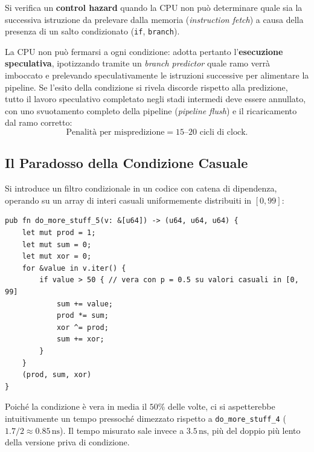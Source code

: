 \begin{definition}
Si verifica un \textbf{control hazard} quando la CPU non pu\`o determinare quale sia la successiva istruzione da prelevare dalla memoria (\textit{instruction fetch}) a causa della presenza di un salto condizionato (\texttt{if}, \texttt{branch}).
\end{definition}

La CPU non pu\`o fermarsi a ogni condizione: adotta pertanto l'\textbf{esecuzione speculativa}, ipotizzando tramite un \textit{branch predictor} quale ramo verr\`a imboccato e prelevando speculativamente le istruzioni successive per alimentare la pipeline. Se l'esito della condizione si rivela discorde rispetto alla predizione, tutto il lavoro speculativo completato negli stadi intermedi deve essere annullato, con uno svuotamento completo della pipeline (\textit{pipeline flush}) e il ricaricamento dal ramo corretto:
\[
\text{Penalit\`a per mispredizione} = 15\text{--}20 \text{ cicli di clock}.
\]

\subsection{Il Paradosso della Condizione Casuale}

Si introduce un filtro condizionale in un codice con catena di dipendenza, operando su un array di interi casuali uniformemente distribuiti in $[0, 99]$:

\begin{lstlisting}[style=rustcode,caption={Ramo condizionale su valori casuali: la CPU non pu\`o predire l'esito.}]
pub fn do_more_stuff_5(v: &[u64]) -> (u64, u64, u64) {
    let mut prod = 1;
    let mut sum = 0;
    let mut xor = 0;
    for &value in v.iter() {
        if value > 50 { // vera con p = 0.5 su valori casuali in [0, 99]
            sum += value;
            prod *= sum;
            xor ^= prod;
            sum += xor;
        }
    }
    (prod, sum, xor)
}
\end{lstlisting}

Poich\'e la condizione \`e vera in media il $50\%$ delle volte, ci si aspetterebbe intuitivamente un tempo pressoch\'e dimezzato rispetto a \texttt{do\_more\_stuff\_4} ($1.7 / 2 \approx 0.85\,\text{ns}$). Il tempo misurato sale invece a $3.5\,\text{ns}$, pi\`u del doppio pi\`u lento della versione priva di condizione.

